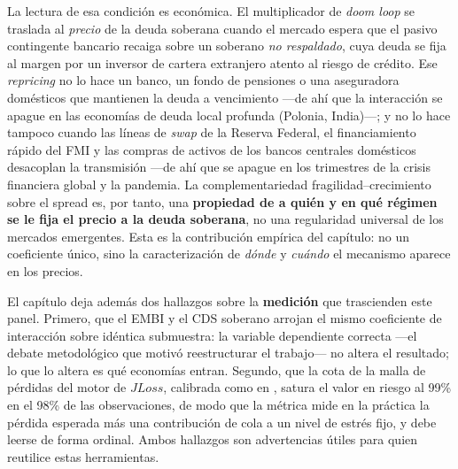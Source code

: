 La lectura de esa condición es económica. El multiplicador de \textit{doom loop} se traslada al \emph{precio} de la deuda soberana cuando el mercado espera que el pasivo contingente bancario recaiga sobre un soberano \emph{no respaldado}, cuya deuda se fija al margen por un inversor de cartera extranjero atento al riesgo de crédito. Ese \textit{repricing} no lo hace un banco, un fondo de pensiones o una aseguradora domésticos que mantienen la deuda a vencimiento —de ahí que la interacción se apague en las economías de deuda local profunda (Polonia, India)—; y no lo hace tampoco cuando las líneas de \textit{swap} de la Reserva Federal, el financiamiento rápido del FMI y las compras de activos de los bancos centrales domésticos desacoplan la transmisión —de ahí que se apague en los trimestres de la crisis financiera global y la pandemia. La complementariedad fragilidad--crecimiento sobre el spread es, por tanto, una \textbf{propiedad de a quién y en qué régimen se le fija el precio a la deuda soberana}, no una regularidad universal de los mercados emergentes. Esta es la contribución empírica del capítulo: no un coeficiente único, sino la caracterización de \emph{dónde} y \emph{cuándo} el mecanismo aparece en los precios.

El capítulo deja además dos hallazgos sobre la \textbf{medición} que trascienden este panel. Primero, que el EMBI y el CDS soberano arrojan el mismo coeficiente de interacción sobre idéntica submuestra: la variable dependiente correcta —el debate metodológico que motivó reestructurar el trabajo— no altera el resultado; lo que lo altera es qué economías entran. Segundo, que la cota de la malla de pérdidas del motor de $JLoss$, calibrada como en \citet{Chari2024}, satura el valor en riesgo al 99\% en el 98\% de las observaciones, de modo que la métrica mide en la práctica la pérdida esperada más una contribución de cola a un nivel de estrés fijo, y debe leerse de forma ordinal. Ambos hallazgos son advertencias útiles para quien reutilice estas herramientas.

